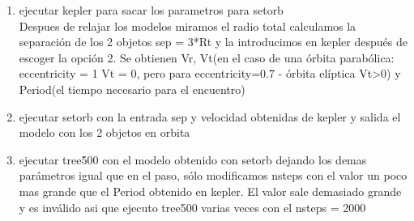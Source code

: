 \documentclass[12pt]{book}
\begin{document}
\begin{enumerate}
\item ejecutar kepler para sacar los parametros para setorb\\
Despues de relajar los modelos miramos el radio total calculamos  la separación de los 2 objetos  sep = 3*Rt y la introducimos en kepler después de escoger la opción 2.
Se obtienen Vr, Vt(en el caso de una órbita  parabólica: eccentricity = 1 Vt = 0, pero para eccentricity=0.7 - órbita elíptica Vt>0) y Period(el tiempo necesario para el encuentro)

\item ejecutar setorb con la entrada sep y velocidad obtenidas de kepler y salida el modelo con los 2 objetos en orbita
\item ejecutar tree500 con el modelo obtenido con setorb dejando los demas parámetros igual que en el paso, sólo modificamos nsteps con el valor un poco mas grande que el Period obtenido en kepler. El valor sale demasiado grande y es inválido asi que ejecuto tree500 varias veces con el nsteps = 2000


\end{enumerate}
\end{document}
